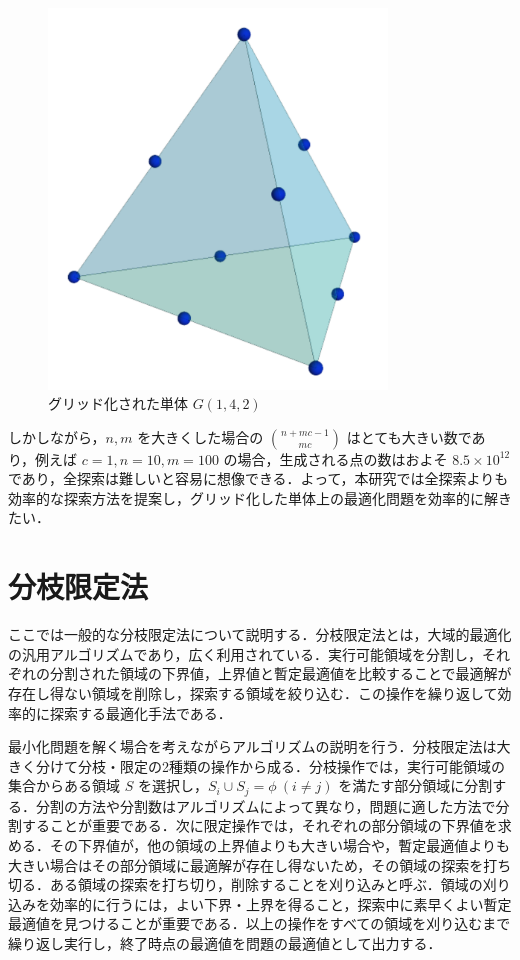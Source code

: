 \documentclass[a4paper,11pt]{jreport}
\begin{document}
\begin{figure}
\begin{center}
\includegraphics[width=9cm]{graphs/grid_simplex.pdf}
\caption{グリッド化された単体 $ G(1, 4, 2) $}
\label{fig:grid_simplex}
\end{center}
\end{figure}

しかしながら，$ n, m $ を大きくした場合の $ \binom{n + mc - 1}{mc} $ はとても大きい数であり，例えば $ c = 1, n = 10, m = 100 $ の場合，生成される点の数はおよそ $ 8.5 \times 10^{12} $ であり，全探索は難しいと容易に想像できる．よって，本研究では全探索よりも効率的な探索方法を提案し，グリッド化した単体上の最適化問題を効率的に解きたい．\par

\section{分枝限定法} \label{sec:bnb}

ここでは一般的な分枝限定法について説明する．分枝限定法とは，大域的最適化の汎用アルゴリズムであり，広く利用されている．実行可能領域を分割し，それぞれの分割された領域の下界値，上界値と暫定最適値を比較することで最適解が存在し得ない領域を削除し，探索する領域を絞り込む．この操作を繰り返して効率的に探索する最適化手法である．\par
最小化問題を解く場合を考えながらアルゴリズムの説明を行う．分枝限定法は大きく分けて分枝・限定の2種類の操作から成る．分枝操作では，実行可能領域の集合からある領域 $ S $ を選択し，$ S_i \cup S_j = \phi \: (i \neq j) $ を満たす部分領域に分割する．分割の方法や分割数はアルゴリズムによって異なり，問題に適した方法で分割することが重要である．次に限定操作では，それぞれの部分領域の下界値を求める．その下界値が，他の領域の上界値よりも大きい場合や，暫定最適値よりも大きい場合はその部分領域に最適解が存在し得ないため，その領域の探索を打ち切る．ある領域の探索を打ち切り，削除することを刈り込みと呼ぶ．領域の刈り込みを効率的に行うには，よい下界・上界を得ること，探索中に素早くよい暫定最適値を見つけることが重要である．以上の操作をすべての領域を刈り込むまで繰り返し実行し，終了時点の最適値を問題の最適値として出力する．\par
\end{document}
